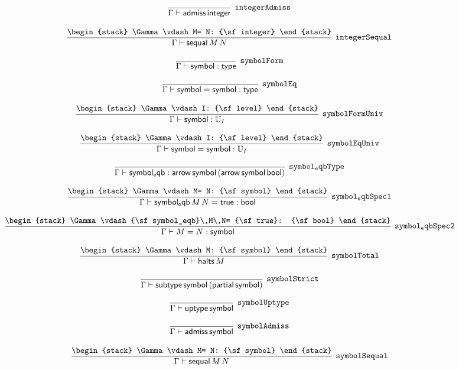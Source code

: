 \[
\infer[{\tt integerAdmiss}]{\Gamma \vdash {\sf admiss}\,{\sf integer}}{}
\]

\[
\infer[{\tt integerSequal}]{\Gamma \vdash {\sf sequal}\,M\,N}{
\begin{stack}
\Gamma \vdash M= N: {\sf integer}
\end{stack}}
\]

\[
\infer[{\tt symbolForm}]{\Gamma \vdash {\sf symbol}: {\sf type}}{}
\]

\[
\infer[{\tt symbolEq}]{\Gamma \vdash {\sf symbol}= {\sf symbol}: {\sf type}}{}
\]

\[
\infer[{\tt symbolFormUniv}]{\Gamma \vdash {\sf symbol}: {\Bbb U}_{I}}{
\begin{stack}
\Gamma \vdash I: {\sf level}
\end{stack}}
\]

\[
\infer[{\tt symbolEqUniv}]{\Gamma \vdash {\sf symbol}= {\sf symbol}: {\Bbb U}_{I}}{
\begin{stack}
\Gamma \vdash I: {\sf level}
\end{stack}}
\]

\[
\infer[{\tt symbol_eqbType}]{\Gamma \vdash {\sf symbol_eqb}: {\sf arrow}\,{\sf symbol}\,({\sf arrow}\,{\sf symbol}\,{\sf bool})}{}
\]

\[
\infer[{\tt symbol_eqbSpec1}]{\Gamma \vdash {\sf symbol_eqb}\,M\,N= {\sf true}: {\sf bool}}{
\begin{stack}
\Gamma \vdash M= N: {\sf symbol}
\end{stack}}
\]

\[
\infer[{\tt symbol_eqbSpec2}]{\Gamma \vdash M= N: {\sf symbol}}{
\begin{stack}
\Gamma \vdash {\sf symbol_eqb}\,M\,N= {\sf true}: {\sf bool}
\end{stack}}
\]

\[
\infer[{\tt symbolTotal}]{\Gamma \vdash {\sf halts}\,M}{
\begin{stack}
\Gamma \vdash M: {\sf symbol}
\end{stack}}
\]

\[
\infer[{\tt symbolStrict}]{\Gamma \vdash {\sf subtype}\,{\sf symbol}\,({\sf partial}\,{\sf symbol})}{}
\]

\[
\infer[{\tt symbolUptype}]{\Gamma \vdash {\sf uptype}\,{\sf symbol}}{}
\]

\[
\infer[{\tt symbolAdmiss}]{\Gamma \vdash {\sf admiss}\,{\sf symbol}}{}
\]

\[
\infer[{\tt symbolSequal}]{\Gamma \vdash {\sf sequal}\,M\,N}{
\begin{stack}
\Gamma \vdash M= N: {\sf symbol}
\end{stack}}
\]

